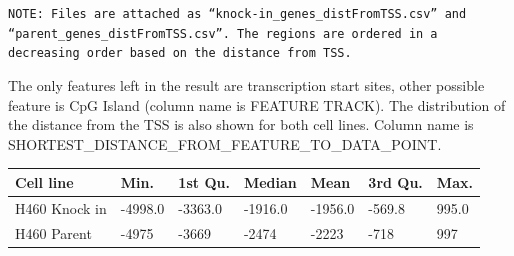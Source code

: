 \documentclass[11pt]{article}
\begin{document}
{\tt NOTE:  Files are attached as “knock-in\_genes\_distFromTSS.csv” and “parent\_genes\_distFromTSS.csv”. The regions are ordered in a decreasing order based on the distance from TSS.}


The only features left in the result are transcription start sites, other possible feature is CpG Island (column name  is  FEATURE TRACK). The distribution of the distance from the TSS is also shown for both cell lines. Column name is SHORTEST\_DISTANCE\_FROM\_FEATURE\_TO\_DATA\_POINT.

\begin{table}[H]
\centering
    \begin{tabular}{|l|l|l|l|l|l|l|}
    \hline
     Cell line & Min. & 1st Qu. & Median & Mean & 3rd Qu. &   Max.  \\ \hline
   H460 Knock in  & -4998.0 & -3363.0 & -1916.0 & -1956.0 & -569.8 & 995.0  \\ \hline
   H460 Parent & -4975 &  -3669 &  -2474 &  -2223 &   -718  &   997  \\ \hline
    \end{tabular}
\end{table}
\end{document}
